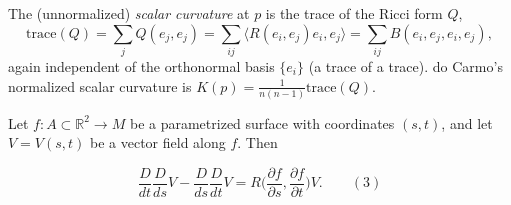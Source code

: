 \begin{definition}
  \label{def:dc-ch4-4-scalar}
  \leanok
  The (unnormalized) \emph{scalar curvature} at $p$ is the trace of the Ricci
  form $Q$,
  $$
  \mathrm{trace}(Q)=\sum_j Q(e_j,e_j)=\sum_{ij}\langle R(e_i,e_j)e_i,e_j\rangle
    =\sum_{ij}B(e_i,e_j,e_i,e_j),
  $$
  again independent of the orthonormal basis $\{e_i\}$ (a trace of a trace). do
  Carmo's normalized scalar curvature is $K(p)=\frac{1}{n(n-1)}\mathrm{trace}(Q)$.
\end{definition}

\begin{lemma}
  \label{lem:dc-ch4-4-1}
  \leanok
  Let $f:A\subset\mathbb{R}^2\to M$ be a parametrized surface with coordinates
  $(s,t)$, and let $V=V(s,t)$ be a vector field along $f$. Then
  
  $$
  \frac{D}{dt}\frac{D}{ds}V-\frac{D}{ds}\frac{D}{dt}V=R\Big(\frac{\partial f}{\partial s},\frac{\partial f}{\partial t}\Big)V.\qquad(3)
  $$
\end{lemma}
